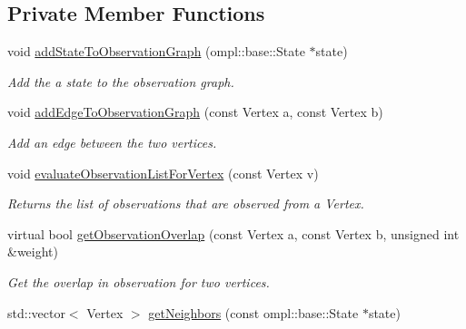 \subsection*{Private Member Functions}
\begin{DoxyCompactItemize}
\item 
\hypertarget{class_n_b_m3_p_a79cb3e3d906cdbe42e2575e992cfac2a}{void \hyperlink{class_n_b_m3_p_a79cb3e3d906cdbe42e2575e992cfac2a}{add\-State\-To\-Observation\-Graph} (ompl\-::base\-::\-State $\ast$state)}\label{class_n_b_m3_p_a79cb3e3d906cdbe42e2575e992cfac2a}

\begin{DoxyCompactList}\small\item\em Add the a state to the observation graph. \end{DoxyCompactList}\item 
\hypertarget{class_n_b_m3_p_a8876d98bfe366711e7a7091c01e48627}{void \hyperlink{class_n_b_m3_p_a8876d98bfe366711e7a7091c01e48627}{add\-Edge\-To\-Observation\-Graph} (const Vertex a, const Vertex b)}\label{class_n_b_m3_p_a8876d98bfe366711e7a7091c01e48627}

\begin{DoxyCompactList}\small\item\em Add an edge between the two vertices. \end{DoxyCompactList}\item 
\hypertarget{class_n_b_m3_p_a3dee1d7f7d5ca23f657cd749e233bba5}{void \hyperlink{class_n_b_m3_p_a3dee1d7f7d5ca23f657cd749e233bba5}{evaluate\-Observation\-List\-For\-Vertex} (const Vertex v)}\label{class_n_b_m3_p_a3dee1d7f7d5ca23f657cd749e233bba5}

\begin{DoxyCompactList}\small\item\em Returns the list of observations that are observed from a Vertex. \end{DoxyCompactList}\item 
\hypertarget{class_n_b_m3_p_a29daac363c46c665bec19fdcceb6a3b4}{virtual bool \hyperlink{class_n_b_m3_p_a29daac363c46c665bec19fdcceb6a3b4}{get\-Observation\-Overlap} (const Vertex a, const Vertex b, unsigned int \&weight)}\label{class_n_b_m3_p_a29daac363c46c665bec19fdcceb6a3b4}

\begin{DoxyCompactList}\small\item\em Get the overlap in observation for two vertices. \end{DoxyCompactList}\item 
\hypertarget{class_n_b_m3_p_a1b3f35bba1b00976812dbf75d1dc7c07}{std\-::vector$<$ Vertex $>$ \hyperlink{class_n_b_m3_p_a1b3f35bba1b00976812dbf75d1dc7c07}{get\-Neighbors} (const ompl\-::base\-::\-State $\ast$state)}\label{class_n_b_m3_p_a1b3f35bba1b00976812dbf75d1dc7c07}


\end{DoxyCompactItemize}
